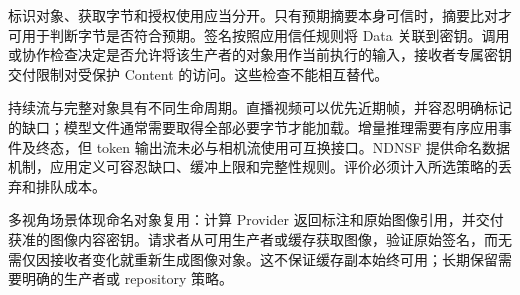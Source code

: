 标识对象、获取字节和授权使用应当分开。只有预期摘要本身可信时，摘要比对才可用于判断字节是否符合预期。签名按照应用信任规则将 Data 关联到密钥。调用或协作检查决定是否允许将该生产者的对象用作当前执行的输入，接收者专属密钥交付限制对受保护 Content 的访问。这些检查不能相互替代。

持续流与完整对象具有不同生命周期。直播视频可以优先近期帧，并容忍明确标记的缺口；模型文件通常需要取得全部必要字节才能加载。增量推理需要有序应用事件及终态，但 token 输出流未必与相机流使用可互换接口。NDNSF 提供命名数据机制，应用定义可容忍缺口、缓冲上限和完整性规则。评价必须计入所选策略的丢弃和排队成本。

多视角场景体现命名对象复用：计算 Provider 返回标注和原始图像引用，并交付获准的图像内容密钥。请求者从可用生产者或缓存获取图像，验证原始签名，而无需仅因接收者变化就重新生成图像对象。这不保证缓存副本始终可用；长期保留需要明确的生产者或 repository 策略。
